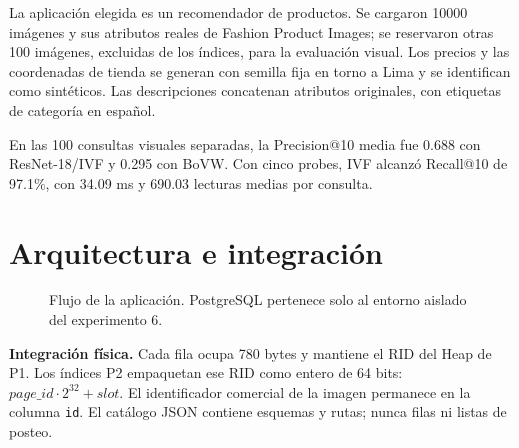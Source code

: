 \documentclass[11pt,a4paper]{article}
\newcommand{\code}[1]{\texttt{#1}}
\begin{document}
La aplicación elegida es un recomendador de productos. Se cargaron 10000 imágenes y sus atributos reales de Fashion Product Images; se reservaron otras 100 imágenes, excluidas de los índices, para la evaluación visual. Los precios y las coordenadas de tienda se generan con semilla fija en torno a Lima y se identifican como sintéticos. Las descripciones concatenan atributos originales, con etiquetas de categoría en español.

En las 100 consultas visuales separadas, la Precision@10 media fue 0.688 con ResNet-18/IVF y 0.295 con BoVW. Con cinco probes, IVF alcanzó Recall@10 de 97.1\%, con 34.09 ms y 690.03 lecturas medias por consulta. 


\section{Arquitectura e integración}\label{sec:arq}
\begin{figure}[H]\centering
{}
\caption{Flujo de la aplicación. PostgreSQL pertenece solo al entorno aislado del experimento 6.}
\end{figure}

\textbf{Integración física.} Cada fila ocupa 780 bytes y mantiene el RID del Heap de P1. Los índices P2 empaquetan ese RID como entero de 64 bits: $page\_id\cdot 2^{32}+slot$. El identificador comercial de la imagen permanece en la columna \code{id}. El catálogo JSON contiene esquemas y rutas; nunca filas ni listas de posteo.
\end{document}
